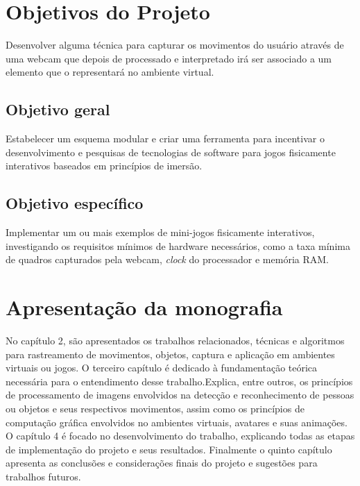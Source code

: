 \section{Objetivos do Projeto}

Desenvolver alguma técnica para capturar os movimentos do usuário através de uma webcam que depois de processado e interpretado irá ser associado a um elemento
que o representará no ambiente virtual.

\subsection{Objetivo geral}

Estabelecer um esquema modular e criar uma ferramenta para incentivar o desenvolvimento e pesquisas de tecnologias de software para jogos fisicamente interativos
baseados em princípios de imersão.

\subsection{Objetivo específico}

Implementar um ou mais exemplos de mini-jogos fisicamente interativos, investigando os requisitos mínimos de hardware necessários, como a taxa mínima de quadros
capturados pela webcam, \textit{clock} do processador e memória RAM.

\section {Apresentação da monografia}

No capítulo 2, são apresentados os trabalhos relacionados, técnicas e algoritmos para rastreamento de movimentos,
objetos, captura e aplicação em ambientes virtuais ou jogos.
O terceiro capítulo é dedicado à fundamentação teórica necessária para o entendimento
desse trabalho.Explica, entre outros, os princípios de processamento de imagens
envolvidos na detecção e reconhecimento de pessoas ou objetos e seus respectivos movimentos,
assim como os princípios de computação gráfica envolvidos no ambientes virtuais,
avatares e suas animações.
O capítulo 4 é focado no desenvolvimento do trabalho, explicando todas as etapas de
implementação do projeto e seus resultados.
Finalmente o quinto capítulo apresenta as conclusões e considerações finais do projeto e sugestões
para trabalhos futuros.

